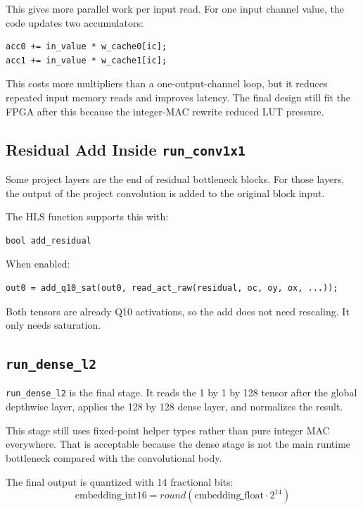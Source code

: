 \documentclass[11pt]{article}
\newcommand{\code}[1]{\texttt{#1}}
\begin{document}
This gives more parallel work per input read.
For one input channel value, the code updates two accumulators:

\begin{lstlisting}
acc0 += in_value * w_cache0[ic];
acc1 += in_value * w_cache1[ic];
\end{lstlisting}

This costs more multipliers than a one-output-channel loop, but it reduces repeated input memory reads and improves latency.
The final design still fit the FPGA after this because the integer-MAC rewrite reduced LUT pressure.

\subsection{Residual Add Inside \code{run\_conv1x1}}

Some project layers are the end of residual bottleneck blocks.
For those layers, the output of the project convolution is added to the original block input.

The HLS function supports this with:

\begin{lstlisting}
bool add_residual
\end{lstlisting}

When enabled:

\begin{lstlisting}
out0 = add_q10_sat(out0, read_act_raw(residual, oc, oy, ox, ...));
\end{lstlisting}

Both tensors are already Q10 activations, so the add does not need rescaling.
It only needs saturation.

\subsection{\code{run\_dense\_l2}}

\code{run\_dense\_l2} is the final stage.
It reads the 1 by 1 by 128 tensor after the global depthwise layer, applies the 128 by 128 dense layer, and normalizes the result.

This stage still uses fixed-point helper types rather than pure integer MAC everywhere.
That is acceptable because the dense stage is not the main runtime bottleneck compared with the convolutional body.

The final output is quantized with 14 fractional bits:
\[
  \text{embedding\_int16} = round(\text{embedding\_float} \cdot 2^{14})
\]
\end{document}
